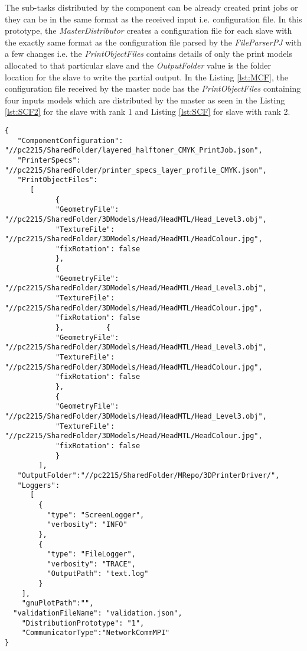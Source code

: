 The sub-tasks distributed by the component can be already created print jobs or they can be in the same format as the received input i.e. configuration file. In this prototype, the \textit{MasterDistributor} creates a configuration file for each slave with the exactly same format as the configuration file parsed by the \textit{FileParserPJ} with a few changes i.e. the \textit{PrintObjectFiles} contains details of only the print models allocated to that particular slave and the \textit{OutputFolder} value is the folder location for the slave to write the partial output. In the Listing \ref{lst:MCF}, the configuration file received by the master node has the \textit{PrintObjectFiles} containing four inputs models which are distributed by the master as seen in the Listing \ref{lst:SCF2} for the slave with rank 1 and Listing \ref{lst:SCF} for slave with rank 2. 

\begin{lstlisting}[label={lst:MCF},caption={Configuration file submitted by the user }]
{
   "ComponentConfiguration": "//pc2215/SharedFolder/layered_halftoner_CMYK_PrintJob.json",
   "PrinterSpecs": "//pc2215/SharedFolder/printer_specs_layer_profile_CMYK.json",
   "PrintObjectFiles": 
	  [
			{
			"GeometryFile": "//pc2215/SharedFolder/3DModels/Head/HeadMTL/Head_Level3.obj",
			"TextureFile": "//pc2215/SharedFolder/3DModels/Head/HeadMTL/HeadColour.jpg",
			"fixRotation": false
			},
			{
			"GeometryFile": "//pc2215/SharedFolder/3DModels/Head/HeadMTL/Head_Level3.obj",
			"TextureFile": "//pc2215/SharedFolder/3DModels/Head/HeadMTL/HeadColour.jpg",
			"fixRotation": false
			},			{
			"GeometryFile": "//pc2215/SharedFolder/3DModels/Head/HeadMTL/Head_Level3.obj",
			"TextureFile": "//pc2215/SharedFolder/3DModels/Head/HeadMTL/HeadColour.jpg",
			"fixRotation": false
			},
			{
			"GeometryFile": "//pc2215/SharedFolder/3DModels/Head/HeadMTL/Head_Level3.obj",
			"TextureFile": "//pc2215/SharedFolder/3DModels/Head/HeadMTL/HeadColour.jpg",
			"fixRotation": false
			}
		],
   "OutputFolder":"//pc2215/SharedFolder/MRepo/3DPrinterDriver/",
   "Loggers": 
	  [
        {
          "type": "ScreenLogger",
          "verbosity": "INFO"  
        },
        {
          "type": "FileLogger",
          "verbosity": "TRACE",
          "OutputPath": "text.log"  
        }
    ],
	"gnuPlotPath":"",
  "validationFileName": "validation.json",
	"DistributionPrototype": "1",
	"CommunicatorType":"NetworkCommMPI"
}
\end{lstlisting}

